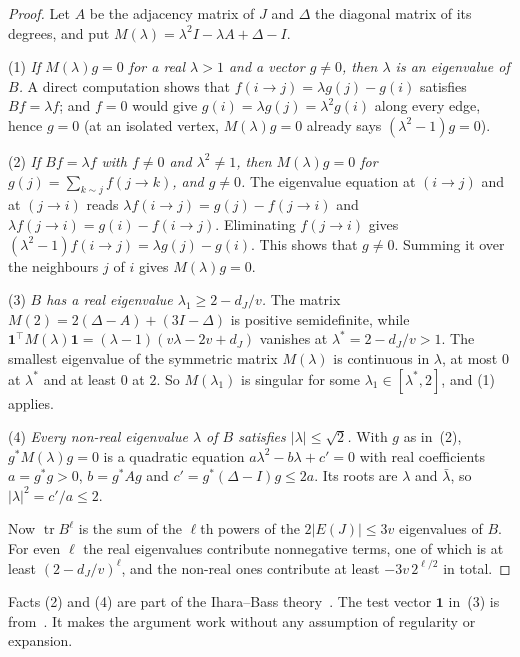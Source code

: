 \documentclass[11pt]{article}
\theoremstyle{definition}
\theoremstyle{remark}
\newcommand{\tr}{\operatorname{tr}}
\numberwithin{equation}{section}
\begin{document}
\begin{proof}
Let $A$ be the adjacency matrix of $J$ and $\Delta$ the diagonal matrix of its degrees, and put
$M(\lambda)=\lambda^{2}I-\lambda A+\Delta-I$.

(1) \emph{If $M(\lambda)g=0$ for a real $\lambda>1$ and a vector $g\ne0$, then $\lambda$ is an
eigenvalue of $B$.} A direct computation shows that $f(i\to j)=\lambda g(j)-g(i)$ satisfies
$Bf=\lambda f$; and $f=0$ would give $g(i)=\lambda g(j)=\lambda^{2}g(i)$ along every edge, hence
$g=0$ (at an isolated vertex, $M(\lambda)g=0$ already says $(\lambda^{2}-1)g=0$).

(2) \emph{If $Bf=\lambda f$ with $f\ne0$ and $\lambda^{2}\ne1$, then $M(\lambda)g=0$ for
$g(j)=\sum_{k\sim j}f(j\to k)$, and $g\ne0$.} The eigenvalue equation at $(i\to j)$ and at
$(j\to i)$ reads $\lambda f(i\to j)=g(j)-f(j\to i)$ and $\lambda f(j\to i)=g(i)-f(i\to j)$.
Eliminating $f(j\to i)$ gives $(\lambda^{2}-1)f(i\to j)=\lambda g(j)-g(i)$. This shows that
$g\ne0$. Summing it over the neighbours $j$ of $i$ gives $M(\lambda)g=0$.

(3) \emph{$B$ has a real eigenvalue $\lambda_1\ge2-d_J/v$.} The matrix
$M(2)=2(\Delta-A)+(3I-\Delta)$ is positive semidefinite, while
$\mathbf{1}^{\!\top}M(\lambda)\mathbf{1}=(\lambda-1)(v\lambda-2v+d_J)$ vanishes at
$\lambda^{*}=2-d_J/v>1$. The smallest eigenvalue of the symmetric matrix $M(\lambda)$ is continuous
in $\lambda$, at most $0$ at $\lambda^{*}$ and at least $0$ at $2$. So $M(\lambda_1)$ is singular for
some $\lambda_1\in[\lambda^{*},2]$, and (1) applies.

(4) \emph{Every non-real eigenvalue $\lambda$ of $B$ satisfies $|\lambda|\le\sqrt2$.} With $g$ as
in~(2), $g^{*}M(\lambda)g=0$ is a quadratic equation $a\lambda^{2}-b\lambda+c'=0$ with real
coefficients $a=g^{*}g>0$, $b=g^{*}Ag$ and $c'=g^{*}(\Delta-I)g\le2a$. Its roots are $\lambda$ and
$\bar\lambda$, so $|\lambda|^{2}=c'/a\le2$.

Now $\tr B^{\ell}$ is the sum of the $\ell$th powers of the $2|E(J)|\le3v$ eigenvalues of $B$. For
even $\ell$ the real eigenvalues contribute nonnegative terms, one of which is at least
$(2-d_J/v)^{\ell}$, and the non-real ones contribute at least $-3v\,2^{\ell/2}$ in total.
\end{proof}

Facts (2) and (4) are part of the Ihara--Bass theory~\cite{Bass,KS}. The test vector $\mathbf{1}$
in~(3) is from~\cite{KNT}. It makes the argument work without any assumption of regularity or
expansion.
\end{document}
